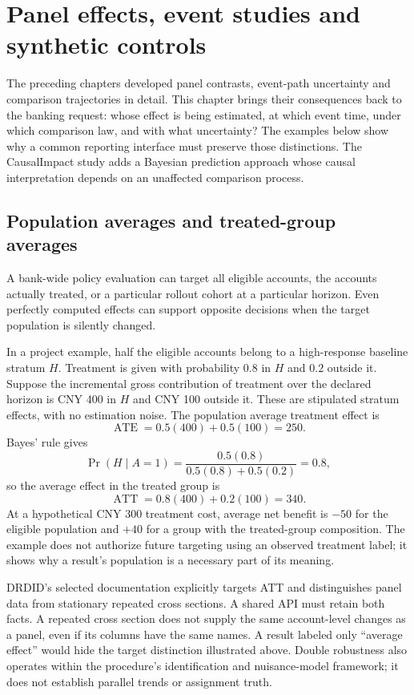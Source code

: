 \chapter{Panel effects, event studies and synthetic controls}
\label{sw:panels}

The preceding chapters developed panel contrasts, event-path uncertainty and
comparison trajectories in detail. This chapter brings their consequences
back to the banking request: whose effect is being estimated, at which event
time, under which comparison law, and with what uncertainty? The examples
below show why a common reporting interface must preserve those distinctions.
The CausalImpact study adds a Bayesian prediction approach whose causal
interpretation depends on an unaffected comparison process.

\section{Population averages and treated-group averages}

A bank-wide policy evaluation can target all eligible accounts, the accounts
actually treated, or a particular rollout cohort at a particular horizon.
Even perfectly computed effects can support opposite decisions when the target
population is silently changed.

In a project example, half the eligible accounts belong to a high-response
baseline stratum \(H\). Treatment is given with probability \(0.8\) in \(H\)
and \(0.2\) outside it. Suppose the incremental gross contribution of treatment
over the declared horizon is CNY 400 in \(H\) and CNY 100 outside it. These
are stipulated stratum effects, with no estimation noise. The population
average treatment effect is
\[
 \operatorname{ATE}=0.5(400)+0.5(100)=250.
\]
Bayes' rule gives
\[
 \Pr(H\mid A=1)
 =\frac{0.5(0.8)}{0.5(0.8)+0.5(0.2)}=0.8,
\]
so the average effect in the treated group is
\[
 \operatorname{ATT}=0.8(400)+0.2(100)=340.
\]
At a hypothetical CNY 300 treatment cost, average net benefit is \(-50\)
for the eligible population and \(+40\) for a group with the treated-group
composition. The example does not authorize future targeting using an observed
treatment label; it shows why a result's population is a necessary part of its
meaning.

DRDID's selected documentation explicitly targets ATT and distinguishes panel
data from stationary repeated cross sections. A shared API must retain both
facts. A repeated cross section does not supply the same account-level changes
as a panel, even if its columns have the same names. A result labeled only
``average effect'' would hide the target distinction illustrated above.
Double robustness also operates within the procedure's identification and
nuisance-model framework; it does not establish parallel trends or assignment
truth. \cite{v12_sw_drdid}

